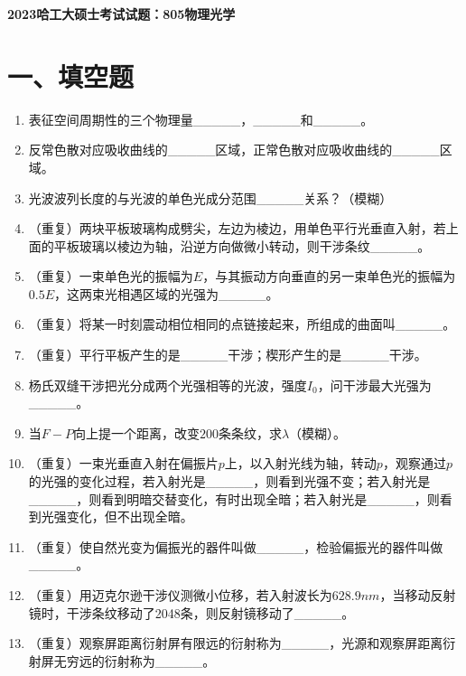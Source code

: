 \documentclass[12pt, a4paper]{article}
\theoremstyle{solution}
\begin{document}
\begin{center}
\Large\textbf{2023哈工大硕士考试试题：805物理光学}
\end{center}





\section*{一、填空题}
\begin{enumerate}
    \item 表征空间周期性的三个物理量\_\_\_\_\_，\_\_\_\_\_和\_\_\_\_\_。
    \item 反常色散对应吸收曲线的\_\_\_\_\_区域，正常色散对应吸收曲线的\_\_\_\_\_区域。
    \item 光波波列长度的与光波的单色光成分范围\_\_\_\_\_关系？（模糊）
    \item （重复）两块平板玻璃构成劈尖，左边为棱边，用单色平行光垂直入射，若上面的平板玻璃以棱边为轴，沿逆方向做微小转动，则干涉条纹\_\_\_\_\_。
    \item （重复）一束单色光的振幅为$E$，与其振动方向垂直的另一束单色光的振幅为$0.5E$，这两束光相遇区域的光强为\_\_\_\_\_。
    \item （重复）将某一时刻震动相位相同的点链接起来，所组成的曲面叫\_\_\_\_\_。
    \item （重复）平行平板产生的是\_\_\_\_\_干涉；楔形产生的是\_\_\_\_\_干涉。
    \item 杨氏双缝干涉把光分成两个光强相等的光波，强度$I_0$，问干涉最大光强为\_\_\_\_\_。
    \item  当$F-P$向上提一个距离，改变$200$条条纹，求$\lambda$（模糊）。
    \item （重复）一束光垂直入射在偏振片$p$上，以入射光线为轴，转动$p$，观察通过$p$的光强的变化过程，若入射光是\_\_\_\_\_，则看到光强不变；若入射光是\_\_\_\_\_，则看到明暗交替变化，有时出现全暗；若入射光是\_\_\_\_\_，则看到光强变化，但不出现全暗。
    \item （重复）使自然光变为偏振光的器件叫做\_\_\_\_\_，检验偏振光的器件叫做\_\_\_\_\_。
    \item （重复）用迈克尔逊干涉仪测微小位移，若入射波长为$628.9nm$，当移动反射镜时，干涉条纹移动了2048条，则反射镜移动了\_\_\_\_\_。
    \item （重复）观察屏距离衍射屏有限远的衍射称为\_\_\_\_\_，光源和观察屏距离衍射屏无穷远的衍射称为\_\_\_\_\_。
\end{enumerate}
\end{document}
